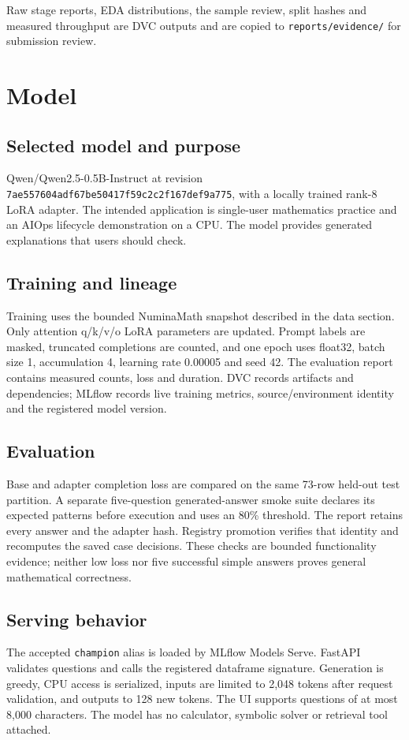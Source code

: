 \documentclass[11pt,a4paper]{article}
\begin{document}
Raw stage reports, EDA distributions, the sample review, split hashes and measured throughput are DVC outputs and are copied to \texttt{reports/\allowbreak{}evidence/\allowbreak{}} for submission review.

\clearpage
\section*{Model}
\subsection*{Selected model and purpose}
Qwen/Qwen2.5-0.5B-Instruct at revision \texttt{7ae55760\allowbreak{}4adf67be\allowbreak{}50417f59\allowbreak{}c2c2f167\allowbreak{}def9a775}, with a locally trained rank-8 LoRA adapter. The intended application is single-user mathematics practice and an AIOps lifecycle demonstration on a CPU. The model provides generated explanations that users should check.

\subsection*{Training and lineage}
Training uses the bounded NuminaMath snapshot described in the data section. Only attention q/k/v/o LoRA parameters are updated. Prompt labels are masked, truncated completions are counted, and one epoch uses float32, batch size 1, accumulation 4, learning rate 0.00005 and seed 42. The evaluation report contains measured counts, loss and duration. DVC records artifacts and dependencies; MLflow records live training metrics, source/environment identity and the registered model version.

\subsection*{Evaluation}
Base and adapter completion loss are compared on the same 73-row held-out test partition. A separate five-question generated-answer smoke suite declares its expected patterns before execution and uses an 80\% threshold. The report retains every answer and the adapter hash. Registry promotion verifies that identity and recomputes the saved case decisions. These checks are bounded functionality evidence; neither low loss nor five successful simple answers proves general mathematical correctness.

\subsection*{Serving behavior}
The accepted \texttt{champion} alias is loaded by MLflow Models Serve. FastAPI validates questions and calls the registered dataframe signature. Generation is greedy, CPU access is serialized, inputs are limited to 2,048 tokens after request validation, and outputs to 128 new tokens. The UI supports questions of at most 8,000 characters. The model has no calculator, symbolic solver or retrieval tool attached.
\end{document}

